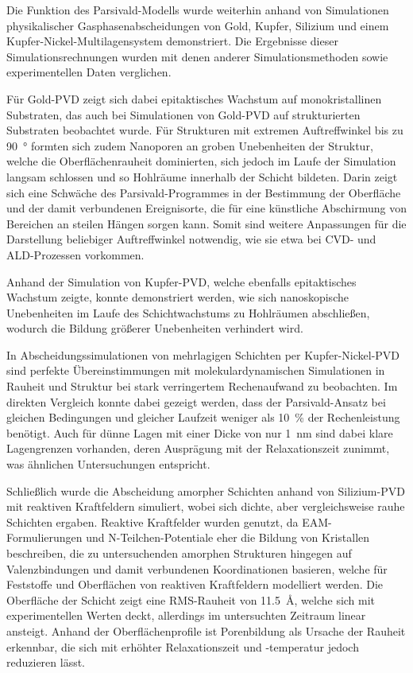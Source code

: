
Die Funktion des Parsivald-Modells wurde weiterhin anhand von Simulationen physikalischer Gasphasenabscheidungen von Gold, Kupfer, Silizium und einem Kupfer-Nickel-Multi\-lagen\-system demonstriert.
Die Ergebnisse dieser Simulationsrechnungen wurden mit denen anderer Simulationsmethoden sowie experimentellen Daten verglichen.

Für Gold-PVD zeigt sich dabei epitaktisches Wachstum auf monokristallinen Substraten, das auch bei Simulationen von Gold-PVD auf strukturierten Substraten beobachtet wurde.
Für Strukturen mit extremen Auftreffwinkel bis zu \SI{90}{\degree} formten sich zudem Nanoporen an groben Unebenheiten der Struktur, welche die Oberflächenrauheit dominierten, sich jedoch im Laufe der Simulation langsam schlossen und so Hohlräume innerhalb der Schicht bildeten.
Darin zeigt sich eine Schwäche des Parsivald-Programmes in der Bestimmung der Oberfläche und der damit verbundenen Ereignisorte, die für eine künstliche Abschirmung von Bereichen an steilen Hängen sorgen kann.
Somit sind weitere Anpassungen für die Darstellung beliebiger Auftreffwinkel notwendig, wie sie etwa bei CVD- und ALD-Prozessen vorkommen.

Anhand der Simulation von Kupfer-PVD, welche ebenfalls epitaktisches Wachstum zeigte, konnte demonstriert werden, wie sich nanoskopische Unebenheiten im Laufe des Schichtwachstums zu Hohlräumen abschließen, wodurch die Bildung größerer Unebenheiten verhindert wird.

In Abscheidungssimulationen von mehrlagigen Schichten per Kupfer-Nickel-PVD sind perfekte Übereinstimmungen mit molekulardynamischen Simulationen in Rauheit und Struktur bei stark verringertem Rechenaufwand zu beobachten.
Im direkten Vergleich konnte dabei gezeigt werden, dass der Parsivald-Ansatz bei gleichen Bedingungen und gleicher Laufzeit weniger als \SI{10}{\percent} der Rechenleistung benötigt.
Auch für dünne Lagen mit einer Dicke von nur \SI{1}{\nano\meter} sind dabei klare Lagengrenzen vorhanden, deren Ausprägung mit der Relaxationszeit zunimmt, was ähnlichen Untersuchungen entspricht\cite{zhou_atomistic_1998}.

Schließlich wurde die Abscheidung amorpher Schichten anhand von Silizium-PVD mit reaktiven Kraftfeldern simuliert, wobei sich dichte, aber vergleichsweise rauhe Schichten ergaben.
Reaktive Kraftfelder wurden genutzt, da EAM-Formulierungen und N-Teilchen-Potentiale eher die Bildung von Kristallen beschreiben, die zu untersuchenden amorphen Strukturen hingegen auf Valenzbindungen und damit verbundenen Koordinationen basieren, welche für Feststoffe und Oberflächen von reaktiven Kraftfeldern modelliert werden.
Die Oberfläche der Schicht zeigt eine RMS-Rauheit von \SI{11.5}{\angstrom}, welche sich mit experimentellen Werten deckt, allerdings im untersuchten Zeitraum linear ansteigt.
Anhand der Oberflächenprofile ist Porenbildung als Ursache der Rauheit erkennbar, die sich mit erhöhter Relaxationszeit und -temperatur jedoch reduzieren lässt.

